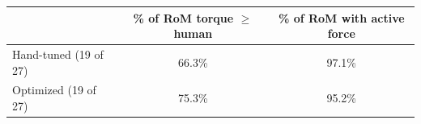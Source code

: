 \begin{tabular}{lcc}
\toprule
 & \% of RoM torque $\geq$ human & \% of RoM with active force \\
\midrule
Hand-tuned (19 of 27) & 66.3\% & 97.1\% \\
Optimized (19 of 27) & 75.3\% & 95.2\% \\
\bottomrule
\end{tabular}
